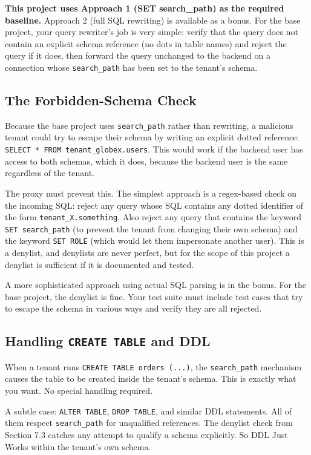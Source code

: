 \documentclass[11pt,a4paper]{article}
\begin{document}
\textbf{This project uses Approach 1 (SET search\_path) as the required baseline.} Approach 2 (full SQL rewriting) is available as a bonus. For the base project, your query rewriter's job is very simple: verify that the query does not contain an explicit schema reference (no dots in table names) and reject the query if it does, then forward the query unchanged to the backend on a connection whose \texttt{search\_path} has been set to the tenant's schema.

\subsection{The Forbidden-Schema Check}
Because the base project uses \texttt{search\_path} rather than rewriting, a malicious tenant could try to escape their schema by writing an explicit dotted reference: \texttt{SELECT * FROM tenant\_globex.users}. This would work if the backend user has access to both schemas, which it does, because the backend user is the same regardless of the tenant.

The proxy must prevent this. The simplest approach is a regex-based check on the incoming SQL: reject any query whose SQL contains any dotted identifier of the form \texttt{tenant\_X.something}. Also reject any query that contains the keyword \texttt{SET search\_path} (to prevent the tenant from changing their own schema) and the keyword \texttt{SET ROLE} (which would let them impersonate another user). This is a denylist, and denylists are never perfect, but for the scope of this project a denylist is sufficient if it is documented and tested.

A more sophisticated approach using actual SQL parsing is in the bonus. For the base project, the denylist is fine. Your test suite must include test cases that try to escape the schema in various ways and verify they are all rejected.

\subsection{Handling \texttt{CREATE TABLE} and DDL}
When a tenant runs \texttt{CREATE TABLE orders (...)}, the \texttt{search\_path} mechanism causes the table to be created inside the tenant's schema. This is exactly what you want. No special handling required.

A subtle case: \texttt{ALTER TABLE}, \texttt{DROP TABLE}, and similar DDL statements. All of them respect \texttt{search\_path} for unqualified references. The denylist check from Section 7.3 catches any attempt to qualify a schema explicitly. So DDL Just Works within the tenant's own schema.
\end{document}
